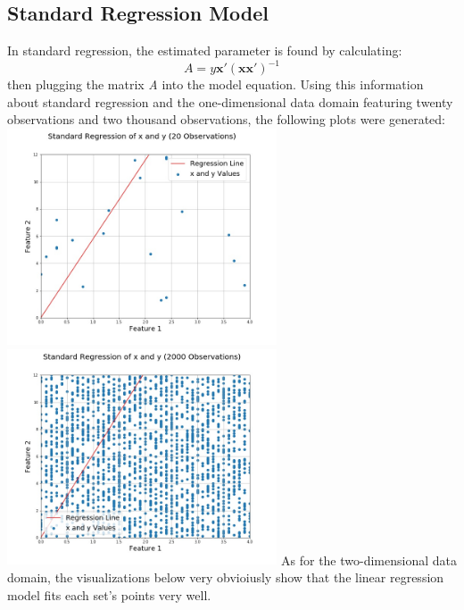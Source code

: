 \documentclass[a4paper,12pt]{IEEEtran}
\begin{document}
\subsection{Standard Regression Model}
\label{sec1}
In standard regression, the estimated parameter is found by calculating: \[\textit{A} = \textit{y}\textbf{x}'(\textbf{x}\textbf{x}')^{-1}\] then plugging the matrix \textit{A} into the model equation. Using this information about standard regression and the one-dimensional data domain featuring twenty observations and two thousand observations, the following plots were generated:
\includegraphics[width=8cm]{std_reg_1d_20_obsv} \includegraphics[width=8cm]{std_reg_1d_2000_obsv}
As for the two-dimensional data domain, the visualizations below very obvioiusly show that the linear regression model fits each set's points very well.
\end{document}
